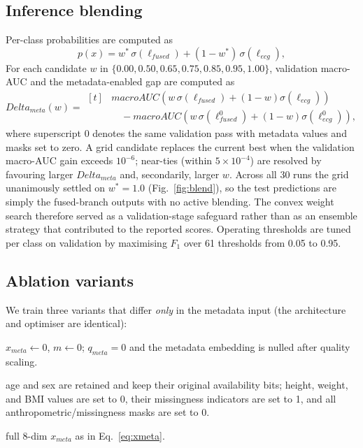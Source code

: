 \documentclass[mathematics,article,submit,pdftex]{Definitions/mdpi}
\def\texttt#1{#1}%
\def\mathrm#1{#1}%
\def\mathbf#1{#1}%
\def\bm#1{#1}%
\def\Delta{Delta }%
\begin{document}
\subsection{Inference blending}
Per-class probabilities are computed as
\begin{equation}
\mathbf{p}(\mathbf{x}) = w^{\ast}\,\sigma(\bm{\ell}_{\mathrm{fused}}) + (1-w^{\ast})\,\sigma(\bm{\ell}_{\mathrm{ecg}}),
\end{equation}
For each candidate $w$ in $\{0.00, 0.50, 0.65, 0.75, 0.85, 0.95, 1.00\}$, validation macro-AUC and the metadata-enabled gap are computed as
\[
\Delta_{\mathrm{meta}}(w)=
\begin{aligned}[t]
&\mathrm{macroAUC}\!\left(w\,\sigma(\bm{\ell}_{\mathrm{fused}})+(1-w)\sigma(\bm{\ell}_{\mathrm{ecg}})\right)\\
&\quad - \mathrm{macroAUC}\!\left(w\,\sigma(\bm{\ell}_{\mathrm{fused}}^{0})+(1-w)\sigma(\bm{\ell}_{\mathrm{ecg}}^{0})\right),
\end{aligned}
\]
where superscript $0$ denotes the same validation pass with metadata values and masks set to zero. A grid candidate replaces the current best when the validation macro-AUC gain exceeds $10^{-6}$; near-ties (within $5{\times}10^{-4}$) are resolved by favouring larger $\Delta_{\mathrm{meta}}$ and, secondarily, larger $w$. Across all 30 runs the grid unanimously settled on $w^{\ast}{=}1.0$ (Fig.~\ref{fig:blend}), so the test predictions are simply the fused-branch outputs with no active blending. The convex weight search therefore served as a validation-stage safeguard rather than as an ensemble strategy that contributed to the reported scores. Operating thresholds are tuned per class on validation by maximising $F_{1}$ over 61 thresholds from 0.05 to 0.95.

\subsection{Ablation variants}
We train three variants that differ \emph{only} in the metadata input (the architecture and optimiser are identical):
\begin{description}[leftmargin=1.5em, style=sameline, font=\normalfont]
\item[\texttt{none}] $\mathbf{x}_{\mathrm{meta}}{\leftarrow}\mathbf{0}$, $\mathbf{m}{\leftarrow}\mathbf{0}$; $q_{\mathrm{meta}}{=}0$ and the metadata embedding is nulled after quality scaling.
\item[\texttt{demo}] age and sex are retained and keep their original availability bits; height, weight, and BMI values are set to 0, their missingness indicators are set to 1, and all anthropometric/missingness masks are set to 0.
\item[\texttt{demo+anthro}] full 8-dim $\mathbf{x}_{\mathrm{meta}}$ as in Eq.~\eqref{eq:xmeta}.
\end{description}
\end{document}
